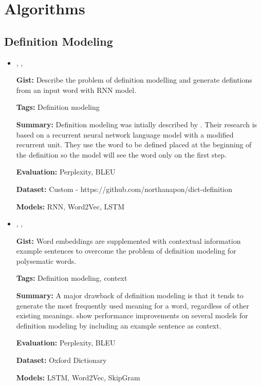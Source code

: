 \documentclass{article}[a4paper]
\newcommand{\bitem}[2]{
    \item[\cite{#1}]
        \citetitle{#1}, \citeauthor{#1}, \citeyear{#1}
        \newline
        {#2}
}%
\begin{document}
\section{Algorithms}
\subsection{Definition Modeling}
\begin{itemize}
    \bitem{noraset_definition_2016}%
    {%
        \textbf{Gist:}
        Describe the problem of definition modelling and generate defintions
        from an input word with RNN model.

        \textbf{Tags:}
        Definition modeling

        \textbf{Summary:}
        Definition modeling was intially described by
        \citeauthor{noraset_definition_2016}. Their research is based on a
        recurrent neural network language model \cite{mikolov_recurrent_2010}
        with a modified recurrent unit. They use the word to be defined placed
        at the beginning of the definition so the model will see the word only
        on the first step.

        \textbf{Evaluation:}
        Perplexity, BLEU

        \textbf{Dataset:}
        Custom - https://github.com/northanapon/dict-definition

        \textbf{Models:}
        RNN, Word2Vec, LSTM
    }%

    \bitem{gadetsky_conditional_2018}%
    {%
        \textbf{Gist:}
        Word embeddings are supplemented with contextual information example
        sentences to overcome the problem of definition modeling for polysematic
        words.

        \textbf{Tags:}
        Definition modeling, context

        \textbf{Summary:}
        A major drawback of definition modeling \cite{noraset_definition_2016}
        is that it tends to generate the most frequently used meaning for a
        word, regardless of other existing meanings.
        \citeauthor{gadetsky_conditional_2018} show performance improvements on
        several models for definition modeling by including an example sentence
        as context.

        \textbf{Evaluation:}
        Perplexity, BLEU

        \textbf{Dataset:}
        Oxford Dictionary

        \textbf{Models:}
        LSTM, Word2Vec, SkipGram
    }%


\end{itemize}
\end{document}
